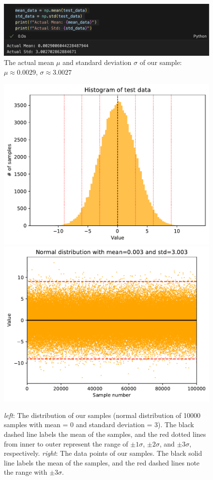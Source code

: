 \documentclass[12pt,a4paper]{article}
\begin{document}
\begin{CJK}{UTF8}{bkai}
\begin{figure}[h]
    \centering
    \includegraphics[width=0.9\linewidth]{figures/code/code_1_3.png}
    \caption{The actual mean $\mu$ and standard deviation $\sigma$ of our sample: $\mu \approx 0.0029$, $\sigma \approx 3.0027$}
    \label{fig:actual_1_3}
\end{figure}
\begin{figure}[h]
    \centering
    \includegraphics[width=0.45\linewidth]{figures/practice_1_1_histogram.pdf}
    \includegraphics[width=0.45\linewidth]{figures/practice_1_1_scatter.pdf}
    \caption{\textit{left}: The distribution of our samples (normal distribution of 10000 samples with mean = 0 and standard deviation = 3). The black dashed line labels the mean of the samples, and the red dotted lines from inner to outer represent the range of $\pm 1\sigma$, $\pm 2\sigma$, and $\pm 3\sigma$, respectively. \textit{right}: The data points of our samples. The black solid line labels the mean of the samples, and the red dashed lines note the range with $\pm 3\sigma$.}
    \label{fig:practice_1}
\end{figure}


\end{CJK}
\end{document}
